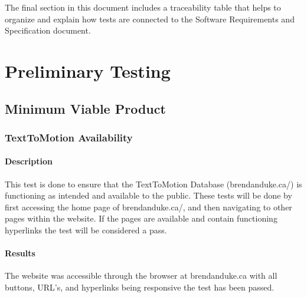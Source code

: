 \documentclass{scrreprt}
\begin{document}
The final section in this document includes a traceability table that helps to organize and explain how tests are connected to the Software Requirements and Specification document.

\chapter{Preliminary Testing}

\section{Minimum Viable Product}
\subsection{TextToMotion Availability}

\subsubsection{Description}

This test is done to ensure that the TextToMotion Database (brendanduke.ca/) is functioning as intended and available to the public. These tests will be done by first accessing the home page of brendanduke.ca/, and then navigating to other pages within the website. If the pages are available and contain functioning hyperlinks the test will be considered a pass.

\subsubsection{Results}

The website was accessible through the browser at brendanduke.ca with all buttons, URL's, and hyperlinks being responsive the test has been passed.
\end{document}
